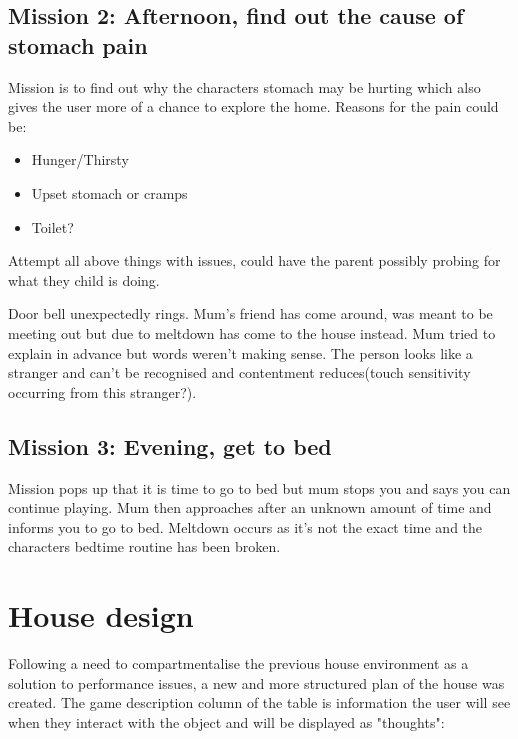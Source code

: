 \documentclass[11pt]{report}
\begin{document}
\subsection*{Mission 2: Afternoon, find out the cause of stomach pain}
Mission is to find out why the characters stomach may be hurting which also gives the user more of a chance to explore the home. Reasons for the pain could be:

\begin{itemize}
\item Hunger/Thirsty
\item Upset stomach or cramps
\item Toilet?
\end{itemize}

Attempt all above things with issues, could have the parent possibly probing for what they child is doing.

Door bell unexpectedly rings. Mum's friend has come around, was meant to be meeting out but due to meltdown has come to the house instead. Mum tried to explain in advance but words weren't making sense. The person looks like a stranger and can't be recognised and contentment reduces(touch sensitivity occurring from this stranger?). 

\subsection*{Mission 3: Evening, get to bed}
Mission pops up that it is time to go to bed but mum stops you and says you can continue playing. Mum then approaches after an unknown amount of time and informs you to go to bed. Meltdown occurs as it's not the exact time and the characters bedtime routine has been broken.

\section{House design}
Following a need to compartmentalise the previous house environment as a solution to performance issues, a new and more structured plan of the house was created. The game description column of the table is information the user will see when they interact with the object and will be displayed as "thoughts":
\end{document}
